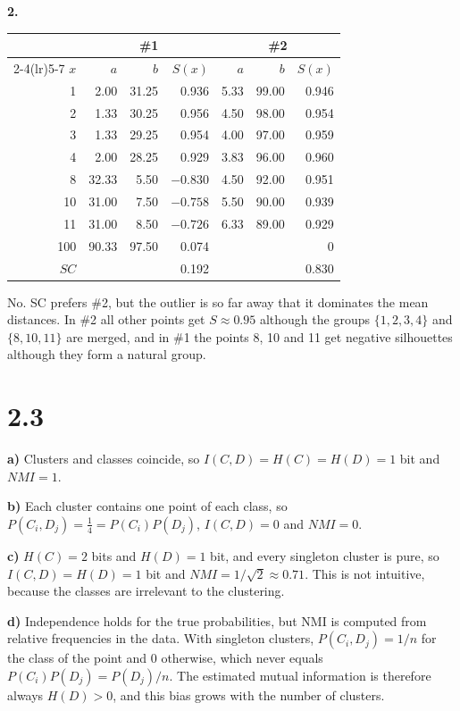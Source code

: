 \documentclass[a4paper,12pt]{article}
\begin{document}
\textbf{2.}\par\nopagebreak
\begin{tabular}{rrrrrrr}
\toprule
 & \multicolumn{3}{c}{\#1} & \multicolumn{3}{c}{\#2} \\
\cmidrule(lr){2-4}\cmidrule(lr){5-7}
$x$ & $a$ & $b$ & $S(x)$ & $a$ & $b$ & $S(x)$ \\
\midrule
1 & 2.00 & 31.25 & 0.936 & 5.33 & 99.00 & 0.946 \\
2 & 1.33 & 30.25 & 0.956 & 4.50 & 98.00 & 0.954 \\
3 & 1.33 & 29.25 & 0.954 & 4.00 & 97.00 & 0.959 \\
4 & 2.00 & 28.25 & 0.929 & 3.83 & 96.00 & 0.960 \\
8 & 32.33 & 5.50 & $-0.830$ & 4.50 & 92.00 & 0.951 \\
10 & 31.00 & 7.50 & $-0.758$ & 5.50 & 90.00 & 0.939 \\
11 & 31.00 & 8.50 & $-0.726$ & 6.33 & 89.00 & 0.929 \\
100 & 90.33 & 97.50 & 0.074 & & & 0 \\
\midrule
$SC$ & & & 0.192 & & & 0.830 \\
\bottomrule
\end{tabular}

No. SC prefers \#2, but the outlier is so far away that it dominates the
mean distances. In \#2 all other points get $S\approx0.95$ although the
groups $\{1,2,3,4\}$ and $\{8,10,11\}$ are merged, and in \#1 the points 8,
10 and 11 get negative silhouettes although they form a natural group.

\section*{2.3}

\textbf{a)} Clusters and classes coincide, so $I(C,D)=H(C)=H(D)=1$ bit and
$NMI=1$.

\textbf{b)} Each cluster contains one point of each class, so
$P(C_i,D_j)=\frac14=P(C_i)P(D_j)$, $I(C,D)=0$ and $NMI=0$.

\textbf{c)} $H(C)=2$ bits and $H(D)=1$ bit, and every singleton cluster is
pure, so $I(C,D)=H(D)=1$ bit and $NMI=1/\sqrt2\approx0.71$. This is not
intuitive, because the classes are irrelevant to the clustering.

\textbf{d)} Independence holds for the true probabilities, but NMI is
computed from relative frequencies in the data. With singleton clusters,
$P(C_i,D_j)=1/n$ for the class of the point and 0 otherwise, which never
equals $P(C_i)P(D_j)=P(D_j)/n$. The estimated mutual information is
therefore always $H(D)>0$, and this bias grows with the number of clusters.
\end{document}
